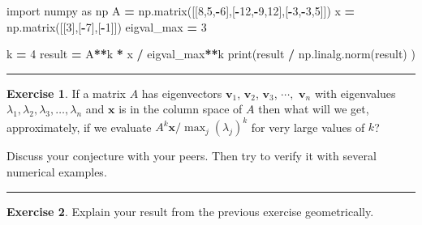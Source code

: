 \documentclass[
]{book}
\newenvironment{Shaded}{\begin{snugshade}}{\end{snugshade}}
\newcommand{\BuiltInTok}[1]{#1}
\newcommand{\DecValTok}[1]{\textcolor[rgb]{0.00,0.00,0.81}{#1}}
\newcommand{\ImportTok}[1]{#1}
\newcommand{\NormalTok}[1]{#1}
\newcommand{\OperatorTok}[1]{\textcolor[rgb]{0.81,0.36,0.00}{\textbf{#1}}}
\theoremstyle{definition}
\theoremstyle{definition}
\theoremstyle{definition}
\newtheorem{exercise}{Exercise}[chapter]
\theoremstyle{remark}
\begin{document}
\begin{Shaded}
\begin{Highlighting}[]
\ImportTok{import}\NormalTok{ numpy }\ImportTok{as}\NormalTok{ np}
\NormalTok{A }\OperatorTok{=}\NormalTok{ np.matrix([[}\DecValTok{8}\NormalTok{,}\DecValTok{5}\NormalTok{,}\OperatorTok{{-}}\DecValTok{6}\NormalTok{],[}\OperatorTok{{-}}\DecValTok{12}\NormalTok{,}\OperatorTok{{-}}\DecValTok{9}\NormalTok{,}\DecValTok{12}\NormalTok{],[}\OperatorTok{{-}}\DecValTok{3}\NormalTok{,}\OperatorTok{{-}}\DecValTok{3}\NormalTok{,}\DecValTok{5}\NormalTok{]])}
\NormalTok{x }\OperatorTok{=}\NormalTok{ np.matrix([[}\DecValTok{3}\NormalTok{],[}\OperatorTok{{-}}\DecValTok{7}\NormalTok{],[}\OperatorTok{{-}}\DecValTok{1}\NormalTok{]])}
\NormalTok{eigval\_max }\OperatorTok{=} \DecValTok{3}

\NormalTok{k }\OperatorTok{=} \DecValTok{4}
\NormalTok{result }\OperatorTok{=}\NormalTok{ A}\OperatorTok{**}\NormalTok{k }\OperatorTok{*}\NormalTok{ x }\OperatorTok{/}\NormalTok{ eigval\_max}\OperatorTok{**}\NormalTok{k}
\BuiltInTok{print}\NormalTok{(result }\OperatorTok{/}\NormalTok{ np.linalg.norm(result) )}
\end{Highlighting}
\end{Shaded}

\begin{center}\rule{0.5\linewidth}{0.5pt}\end{center}

\begin{exercise}
\protect\hypertarget{exr:unnamed-chunk-364}{}{\label{exr:unnamed-chunk-364} }If a matrix \(A\) has eigenvectors \(\boldsymbol{v}_1\), \(\boldsymbol{v}_2\), \(\boldsymbol{v}_3\), \(\cdots,\) \(\boldsymbol{v}_n\) with eigenvalues \(\lambda_1, \lambda_2, \lambda_3, \ldots, \lambda_n\) and \(\boldsymbol{x}\) is in the column space of \(A\) then what will we get, approximately, if we evaluate \(A^k \boldsymbol{x} / \max_{j}(\lambda_j)^k\) for very large values of \(k\)?

Discuss your conjecture with your peers. Then try to verify it with several numerical examples.
\end{exercise}

\begin{center}\rule{0.5\linewidth}{0.5pt}\end{center}

\begin{exercise}
\protect\hypertarget{exr:unnamed-chunk-365}{}{\label{exr:unnamed-chunk-365} }Explain your result from the previous exercise geometrically.
\end{exercise}
\end{document}
